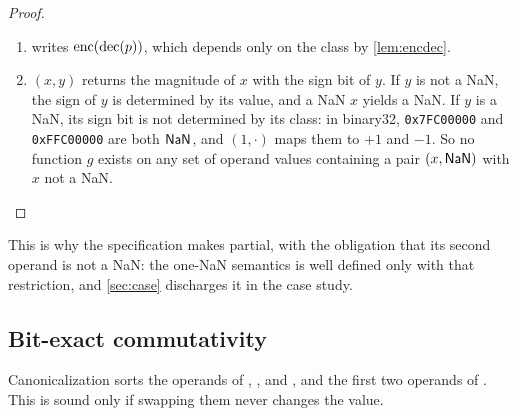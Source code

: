 \begin{proof}
\begin{enumerate}[label=(\alph*)]
  the infinities, and on the domain the result depends only on the value. Conversion from an
  integer never sees a NaN.
\item {} writes $\mathrm{enc}(\mathrm{dec}(p))$, which depends only on the class by
  \cref{lem:encdec}.
\item {}$(x,y)$ returns the magnitude of $x$ with the sign bit of $y$. If $y$ is
  not a NaN, the sign of $y$ is determined by its value, and a NaN $x$ yields a NaN. If $y$ is a
  NaN, its sign bit is not determined by its class: in binary32, \texttt{0x7FC00000} and
  \texttt{0xFFC00000} are both $\mathsf{NaN}$, and $(1,\cdot)$ maps them to $+1$ and $-1$.
  So no function $\hat g$ exists on any set of operand values containing a pair $(x,\mathsf{NaN})$ with
  $x$ not a NaN. \qedhere
\end{enumerate}
\end{proof}

This is why the specification makes  partial, with the obligation
 that its second operand is not a NaN: the one-NaN semantics is well defined
only with that restriction, and \cref{sec:case} discharges it in the case study.

\subsection{Bit-exact commutativity}

Canonicalization sorts the operands of , ,  and , and the
first two operands of . This is sound only if swapping them never changes the value.

